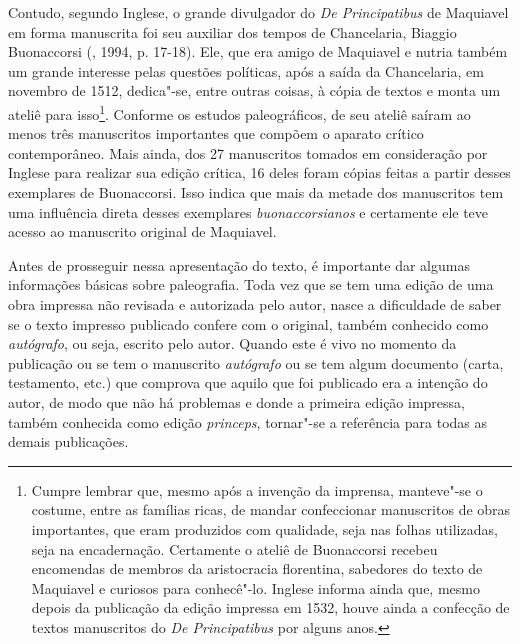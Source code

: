 Contudo, segundo Inglese, o grande divulgador do \emph{De Principatibus}
de Maquiavel em forma manuscrita foi seu auxiliar dos tempos de
Chancelaria, Biaggio Buonaccorsi (, 1994, p. 17-18). Ele, que era
amigo de Maquiavel e nutria também um grande interesse pelas questões
políticas, após a saída da Chancelaria, em novembro de 1512, dedica"-se,
entre outras coisas, à cópia de textos e monta um ateliê para
isso\footnote{Cumpre lembrar que, mesmo após a invenção da imprensa,
  manteve"-se o costume, entre as famílias ricas, de mandar confeccionar
  manuscritos de obras importantes, que eram produzidos com qualidade,
  seja nas folhas utilizadas, seja na encadernação. Certamente o ateliê
  de Buonaccorsi recebeu encomendas de membros da aristocracia
  florentina, sabedores do texto de Maquiavel e curiosos para
  conhecê"-lo. Inglese informa ainda que, mesmo depois da publicação da
  edição impressa em 1532, houve ainda a confecção de textos manuscritos
  do \emph{De Principatibus} por alguns anos.}. Conforme os estudos
paleográficos, de seu ateliê saíram ao menos três manuscritos
importantes que compõem o aparato crítico contemporâneo. Mais ainda, dos
27 manuscritos tomados em consideração por Inglese para realizar sua
edição crítica, 16 deles foram cópias feitas a partir desses exemplares
de Buonaccorsi. Isso indica que mais da metade dos manuscritos tem uma
influência direta desses exemplares \emph{buonaccorsianos} e certamente
ele teve acesso ao manuscrito original de Maquiavel.

Antes de prosseguir nessa apresentação do texto, é importante dar
algumas informações básicas sobre paleografia. Toda vez que se tem uma
edição de uma obra impressa não revisada e autorizada pelo autor, nasce
a dificuldade de saber se o texto impresso publicado confere com o
original, também conhecido como \emph{autógrafo}, ou seja, escrito pelo
autor. Quando este é vivo no momento da publicação ou se tem o
manuscrito \emph{autógrafo} ou se tem algum documento (carta,
testamento, etc.) que comprova que aquilo que foi publicado era a
intenção do autor, de modo que não há problemas e donde a primeira
edição impressa, também conhecida como edição \emph{princeps}, tornar"-se
a referência para todas as demais publicações.

